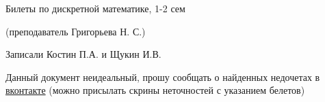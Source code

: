 \documentclass[12pt, fleqn]{article}
\begin{document}
  \begin{center}
    \huge Билеты по дискретной математике, 1-2 сем

    \Large (преподаватель Григорьева Н. С.)

    \large Записали Костин П.А. и Щукин И.В.
  \end{center}

  Данный документ неидеальный, прошу сообщать о найденных недочетах в \href{https://vk.com/drab_existence_a}{вконтакте} (можно присылать скрины неточностей с указанием белетов)
  \tableofcontents
  \newpage














\end{document}
